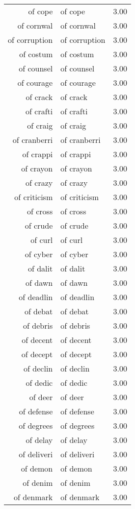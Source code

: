 \begin{table}[ht]
\begin{tabular}{rlr}
  of cope & of cope & 3.00 \\ 
  of cornwal & of cornwal & 3.00 \\ 
  of corruption & of corruption & 3.00 \\ 
  of costum & of costum & 3.00 \\ 
  of counsel & of counsel & 3.00 \\ 
  of courage & of courage & 3.00 \\ 
  of crack & of crack & 3.00 \\ 
  of crafti & of crafti & 3.00 \\ 
  of craig & of craig & 3.00 \\ 
  of cranberri & of cranberri & 3.00 \\ 
  of crappi & of crappi & 3.00 \\ 
  of crayon & of crayon & 3.00 \\ 
  of crazy & of crazy & 3.00 \\ 
  of criticism & of criticism & 3.00 \\ 
  of cross & of cross & 3.00 \\ 
  of crude & of crude & 3.00 \\ 
  of curl & of curl & 3.00 \\ 
  of cyber & of cyber & 3.00 \\ 
  of dalit & of dalit & 3.00 \\ 
  of dawn & of dawn & 3.00 \\ 
  of deadlin & of deadlin & 3.00 \\ 
  of debat & of debat & 3.00 \\ 
  of debris & of debris & 3.00 \\ 
  of decent & of decent & 3.00 \\ 
  of decept & of decept & 3.00 \\ 
  of declin & of declin & 3.00 \\ 
  of dedic & of dedic & 3.00 \\ 
  of deer & of deer & 3.00 \\ 
  of defense & of defense & 3.00 \\ 
  of degrees & of degrees & 3.00 \\ 
  of delay & of delay & 3.00 \\ 
  of deliveri & of deliveri & 3.00 \\ 
  of demon & of demon & 3.00 \\ 
  of denim & of denim & 3.00 \\ 
  of denmark & of denmark & 3.00 \\ 

\end{tabular}
\end{table}
